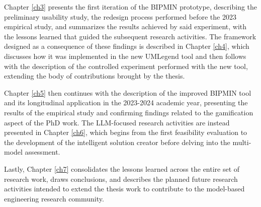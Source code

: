 Chapter \ref{ch3} presents the first iteration of the BIPMIN prototype, describing the preliminary usability study, the redesign process performed before the 2023 empirical study, and summarizes the results achieved by said experiment, with the lessons learned that guided the subsequent research activities. The framework designed as a consequence of these findings is described in Chapter \ref{ch4}, which discusses how it was implemented in the new UMLegend tool and then follows with the description of the controlled experiment performed with the new tool, extending the body of contributions brought by the thesis.

Chapter \ref{ch5} then continues with the description of the improved BIPMIN tool and its longitudinal application in the 2023-2024 academic year, presenting the results of the empirical study and confirming findings related to the gamification aspect of the PhD work. The LLM-focused research activities are instead presented in Chapter \ref{ch6}, which begins from the first feasibility evaluation to the development of the intelligent solution creator before delving into the multi-model assessment. 

Lastly, Chapter \ref{ch7} consolidates the lessons learned across the entire set of research work, draws conclusions, and describes the planned future research activities intended to extend the thesis work to contribute to the model-based engineering research community.

